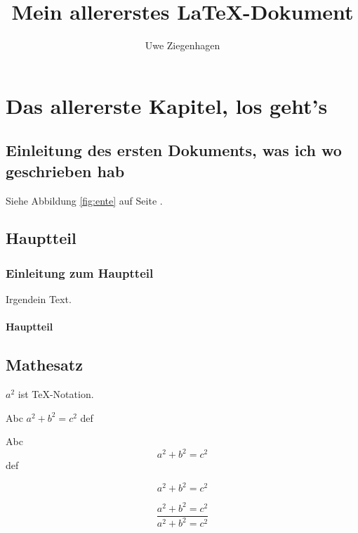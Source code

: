 \documentclass[15pt,ngerman]{scrreprt}
\author{Uwe Ziegenhagen}
\title{Mein allererstes \LaTeX-Dokument}
\begin{document}
\maketitle

\tableofcontents

\listoffigures

\chapter{Das allererste Kapitel, los geht's}

\section{Einleitung des ersten Dokuments, was ich wo geschrieben hab}

\blindtext

Siehe Abbildung \ref{fig:ente} auf Seite \pageref{fig:ente}.

\section{Hauptteil}

\subsection{Einleitung zum Hauptteil}

Irgendein Text.

\subsubsection{Hauptteil}


\blindtext[2]

\blindtext[2]

\section{Mathesatz}

$a^2$ ist \TeX-Notation.

Abc \( a^2 + b^2 = c^2\) def

Abc \[ a^2 + b^2 = c^2\] def %


\begin{equation}
a^2 + b^2 = c^2
\end{equation}

\begin{equation}
\frac{a^2 + b^2 = c^2}{a^2 + b^2 = c^2}
\end{equation}
\end{document}
